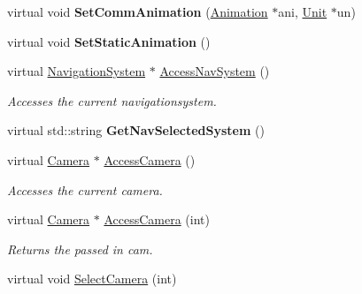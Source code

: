 \begin{DoxyCompactItemize}
\item 
virtual void {\bfseries Set\+Comm\+Animation} (\hyperlink{classAnimation}{Animation} $\ast$ani, \hyperlink{classUnit}{Unit} $\ast$un)\hypertarget{classCockpit_a6199d9fa448fbb229744282e63912f64}{}\label{classCockpit_a6199d9fa448fbb229744282e63912f64}

\item 
virtual void {\bfseries Set\+Static\+Animation} ()\hypertarget{classCockpit_a0743c9c20c4b56eb21d08859be171e98}{}\label{classCockpit_a0743c9c20c4b56eb21d08859be171e98}

\item 
virtual \hyperlink{classNavigationSystem}{Navigation\+System} $\ast$ \hyperlink{classCockpit_a795ae1ce60cad8d66ba9d062435ba9ac}{Access\+Nav\+System} ()\hypertarget{classCockpit_a795ae1ce60cad8d66ba9d062435ba9ac}{}\label{classCockpit_a795ae1ce60cad8d66ba9d062435ba9ac}

\begin{DoxyCompactList}\small\item\em Accesses the current navigationsystem. \end{DoxyCompactList}\item 
virtual std\+::string {\bfseries Get\+Nav\+Selected\+System} ()\hypertarget{classCockpit_aa771ef2631ae36eff272e828aa6131a1}{}\label{classCockpit_aa771ef2631ae36eff272e828aa6131a1}

\item 
virtual \hyperlink{classCamera}{Camera} $\ast$ \hyperlink{classCockpit_a60d1ff1ef51c62c036ec1acc1321be33}{Access\+Camera} ()\hypertarget{classCockpit_a60d1ff1ef51c62c036ec1acc1321be33}{}\label{classCockpit_a60d1ff1ef51c62c036ec1acc1321be33}

\begin{DoxyCompactList}\small\item\em Accesses the current camera. \end{DoxyCompactList}\item 
virtual \hyperlink{classCamera}{Camera} $\ast$ \hyperlink{classCockpit_a4d844e6bb4ed19f6ca763d0a08c5ed1c}{Access\+Camera} (int)\hypertarget{classCockpit_a4d844e6bb4ed19f6ca763d0a08c5ed1c}{}\label{classCockpit_a4d844e6bb4ed19f6ca763d0a08c5ed1c}

\begin{DoxyCompactList}\small\item\em Returns the passed in cam. \end{DoxyCompactList}\item 
virtual void \hyperlink{classCockpit_a3a6ed1512288540e668cd8f0cba94720}{Select\+Camera} (int)\hypertarget{classCockpit_a3a6ed1512288540e668cd8f0cba94720}{}\label{classCockpit_a3a6ed1512288540e668cd8f0cba94720}


\end{DoxyCompactItemize}
